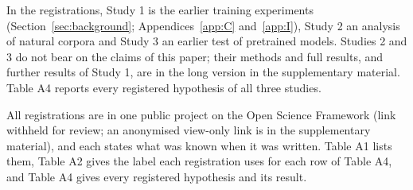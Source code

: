 \label{app:A}
\setcounter{table}{0}\renewcommand{\thetable}{A\arabic{table}}
\setcounter{figure}{0}\renewcommand{\thefigure}{A\arabic{figure}}
In the registrations, Study 1 is the earlier training experiments (Section~\ref{sec:background}; Appendices~\ref{app:C} and~\ref{app:I}), Study 2 an analysis of natural corpora and Study 3 an earlier test of pretrained models. Studies 2 and 3 do not bear on the claims of this paper; their methods and full results, and further results of Study 1, are in the long version in the supplementary material. Table A4 reports every registered hypothesis of all three studies.

All registrations are in one public project on the Open Science Framework (link withheld for review; an anonymised view-only link is in the supplementary material), and each states what was known when it was written. Table A1 lists them, Table A2 gives the label each registration uses for each row of Table A4, and Table A4 gives every registered hypothesis and its result.

